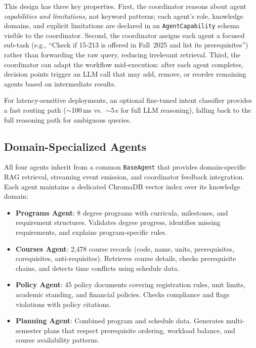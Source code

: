 This design has three key properties. First, the coordinator reasons about agent \emph{capabilities and limitations}, not keyword patterns; each agent's role, knowledge domains, and explicit limitations are declared in an \texttt{AgentCapability} schema visible to the coordinator. Second, the coordinator assigns each agent a focused sub-task (e.g., ``Check if 15-213 is offered in Fall~2025 and list its prerequisites'') rather than forwarding the raw query, reducing irrelevant retrieval. Third, the coordinator can adapt the workflow mid-execution: after each agent completes, decision points trigger an LLM call that may add, remove, or reorder remaining agents based on intermediate results.

For latency-sensitive deployments, an optional fine-tuned intent classifier provides a fast routing path ($\sim$100\,ms vs.\ $\sim$5\,s for full LLM reasoning), falling back to the full reasoning path for ambiguous queries.

\subsection{Domain-Specialized Agents}

All four agents inherit from a common \texttt{BaseAgent} that provides domain-specific RAG retrieval, streaming event emission, and coordinator feedback integration. Each agent maintains a dedicated ChromaDB vector index over its knowledge domain:

\begin{itemize}
    \item \textbf{Programs Agent}: 8 degree programs with curricula, milestones, and requirement structures. Validates degree progress, identifies missing requirements, and explains program-specific rules.
    \item \textbf{Courses Agent}: 2,478 course records (code, name, units, prerequisites, corequisites, anti-requisites). Retrieves course details, checks prerequisite chains, and detects time conflicts using schedule data.
    \item \textbf{Policy Agent}: 45 policy documents covering registration rules, unit limits, academic standing, and financial policies. Checks compliance and flags violations with policy citations.
    \item \textbf{Planning Agent}: Combined program and schedule data. Generates multi-semester plans that respect prerequisite ordering, workload balance, and course availability patterns.
\end{itemize}

